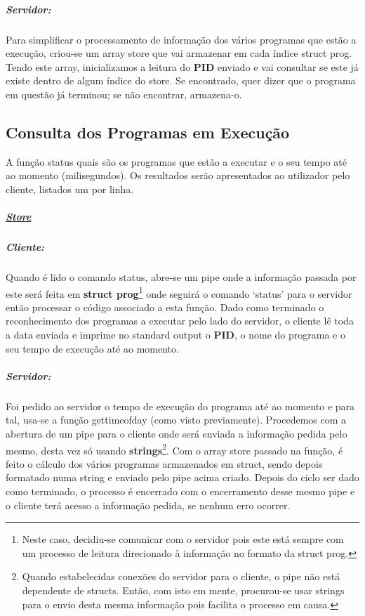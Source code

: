 \documentclass{report}
\begin{document}
\subparagraph{Servidor:}

Para simplificar o processamento de informação dos vários programas que estão a execução, criou-se um array store que vai armazenar em cada índice struct prog. Tendo este array, inicializamos a leitura do \textbf{PID} enviado e vai consultar se este já existe dentro de algum índice do store. Se encontrado, quer dizer que o programa em questão já terminou; se não encontrar, armazena-o. 

\subsection{Consulta dos Programas em Execução}
A função status quais são os programas que estão a executar e o seu tempo até ao momento (milisegundos). Os resultados serão apresentados ao utilizador pelo cliente, listados um por linha.

\subparagraph{\underline{Store}}

\subparagraph{Cliente:}

Quando é lido o comando status, abre-se um pipe onde a informação passada por este será feita em \textbf{struct prog}\footnote{Neste caso, decidiu-se comunicar com o servidor pois este está sempre com um processo de leitura direcionado à informação no formato da struct prog.} onde seguirá o comando ‘status’ para o servidor então processar o código associado a esta função. Dado como terminado o reconhecimento dos programas a executar pelo lado do servidor, o cliente lê toda a data enviada e imprime no standard output o \textbf{PID}, o nome do programa e o seu tempo de execução até ao momento.


\subparagraph{Servidor:}

Foi pedido ao servidor o tempo de execução do programa até ao momento e para tal, usa-se a função gettimeofday (como visto previamente). Procedemos com a abertura de um pipe para o cliente onde será enviada a informação pedida pelo mesmo, desta vez só usando \textbf{strings}\footnote{Quando estabelecidas conexões do servidor para o cliente, o pipe não está dependente de structs. Então, com isto em mente, procurou-se usar strings para o envio desta mesma informação pois facilita o processo em causa.}.
Com o array store passado na função, é feito o cálculo dos vários programas armazenados em struct, sendo depois formatado numa string e enviado pelo pipe acima criado. Depois do ciclo ser dado como terminado, o processo é encerrado com o encerramento desse mesmo pipe e o cliente terá acesso a informação pedida, se nenhum erro ocorrer.\\
\end{document}
